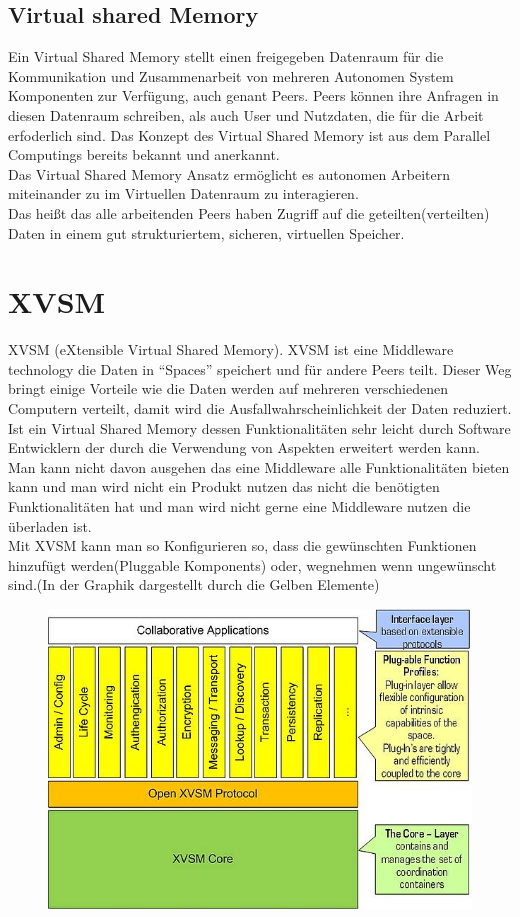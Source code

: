 \documentclass[a4paper,12pt]{scrreprt}
\begin{document}
			
			
						
			\subsection{Virtual shared Memory}
			
			Ein Virtual Shared Memory stellt einen freigegeben Datenraum für die Kommunikation und Zusammenarbeit von mehreren Autonomen System Komponenten zur Verfügung, auch genant Peers. Peers können ihre Anfragen in diesen Datenraum schreiben, als auch User und Nutzdaten, die für die Arbeit erfoderlich sind.
			Das Konzept des Virtual Shared Memory ist aus dem Parallel Computings bereits bekannt und anerkannt.\\
			Das Virtual Shared Memory Ansatz ermöglicht es autonomen Arbeitern miteinander zu im Virtuellen Datenraum zu interagieren.\\
			Das heißt das alle arbeitenden Peers haben Zugriff auf die geteilten(verteilten) Daten in einem gut strukturiertem, sicheren, virtuellen Speicher.
			 
			
			
			  
		
		\section{XVSM}
		XVSM (eXtensible Virtual Shared Memory). XVSM ist eine Middleware technology die Daten in “Spaces” speichert  und für andere Peers teilt. Dieser Weg bringt einige Vorteile wie die Daten werden auf mehreren verschiedenen Computern verteilt, damit wird die Ausfallwahrscheinlichkeit der Daten reduziert.\\
		
		Ist ein Virtual Shared Memory dessen Funktionalitäten sehr leicht durch Software Entwicklern der durch die Verwendung von Aspekten erweitert werden kann. Man kann nicht davon ausgehen das eine Middleware alle Funktionalitäten bieten kann und man wird nicht ein Produkt nutzen das nicht die benötigten Funktionalitäten hat und man wird nicht gerne eine Middleware nutzen die überladen ist.\\
		Mit XVSM kann man so Konfigurieren so, dass die gewünschten Funktionen hinzufügt werden(Pluggable Komponents) oder, wegnehmen wenn ungewünscht sind.(In der Graphik dargestellt durch die Gelben Elemente)\\
		\begin{figure}[h]
\centering
\includegraphics[width=0.7\linewidth]{./08570620af}
\caption{}
\label{fig:08570620af}
\end{figure}
\end{document}
